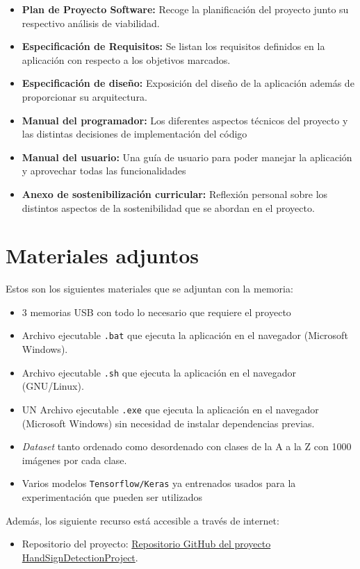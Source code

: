\begin{itemize}
\tightlist
    \item 
        \textbf{Plan de Proyecto Software:} Recoge la planificación del proyecto junto su respectivo análisis de viabilidad.
    \item
        \textbf{Especificación de Requisitos:} Se listan los requisitos definidos en la aplicación con respecto a los objetivos marcados.
    \item 
        \textbf{Especificación de diseño:} Exposición del diseño de la aplicación además de proporcionar su arquitectura.
    \item 
        \textbf{Manual del programador:} Los diferentes aspectos técnicos del proyecto y las distintas decisiones de implementación del código
    \item 
        \textbf{Manual del usuario:} Una guía de usuario para poder manejar la aplicación y aprovechar todas las funcionalidades
    \item 
        \textbf{Anexo de sostenibilización curricular:} Reflexión personal sobre los distintos aspectos de la sostenibilidad que se abordan en el proyecto.
    
\end{itemize}


\section{Materiales adjuntos}\label{materiales-adjuntos}
Estos son los siguientes materiales que se adjuntan con la memoria:

\begin{itemize}
\tightlist
    \item 3 memorias USB con todo lo necesario que requiere el proyecto
    \item Archivo ejecutable \texttt{.bat} que ejecuta la aplicación en el navegador (Microsoft Windows).
    \item Archivo ejecutable \texttt{.sh} que ejecuta la aplicación en el navegador (GNU/Linux).
    \item UN Archivo ejecutable \texttt{.exe} que ejecuta la aplicación en el navegador (Microsoft Windows) sin necesidad de instalar dependencias previas.
    \item \textit{Dataset} tanto ordenado como desordenado con clases de la A a la Z con 1000 imágenes por cada clase.
    \item Varios modelos \texttt{Tensorflow/Keras} ya entrenados usados para la experimentación que pueden ser utilizados 
\end{itemize}

Además, los siguiente recurso está accesible a través de internet:
\begin{itemize}
\tightlist
    \item Repositorio del proyecto:
        \href{https://github.com/hgomezmartin/HandSignDetectionProject}{Repositorio GitHub del proyecto HandSignDetectionProject}.
\end{itemize}


